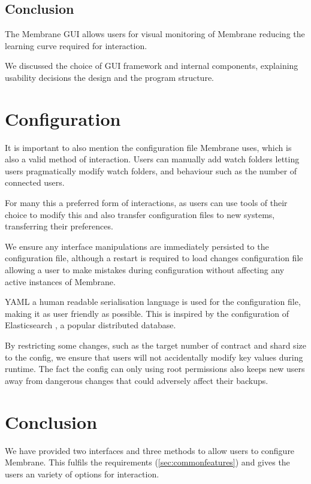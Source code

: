 \documentclass[11pt, a4paper, twocolumn, twoside]{report}
\begin{document}
\subsection{Conclusion}

The Membrane GUI allows users for visual monitoring of Membrane reducing the learning curve required for interaction.

We discussed the choice of GUI framework and internal components, explaining usability decisions the design and the program structure.

\section{Configuration}

It is important to also mention the configuration file Membrane uses, which is also a valid method of interaction. Users can manually add watch folders letting users pragmatically modify watch folders, and behaviour such as the number of connected users.

For many this a preferred form of interactions, as users can use tools of their choice to modify this and also transfer configuration files to new systems, transferring their preferences.

We ensure any interface manipulations are immediately persisted to the configuration file, although a restart is required to load changes configuration file allowing a user to make mistakes during configuration without affecting any active instances of Membrane.

YAML a human readable serialisation language \citep{evans2009yaml} is used for the configuration file, making it as user friendly as possible. This is inspired by the configuration of Elasticsearch \citep{elastic2017config}, a popular distributed database.

By restricting some changes, such as the target number of contract and shard size to the config, we ensure that users will not accidentally modify key values during runtime. The fact the config can only using root permissions also keeps new users away from dangerous changes that could adversely affect their backups.

\section{Conclusion}

We have provided two interfaces and three methods to allow users to configure Membrane. This fulfils the requirements (\ref{sec:commonfeatures}) and gives the users an variety of options for interaction.
\end{document}
